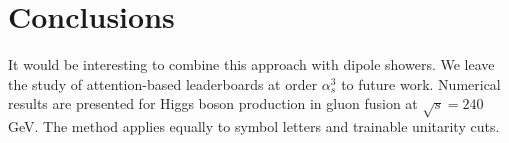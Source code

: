 \section{Conclusions}\label{sec:conclusions}

It would be interesting to combine this approach with dipole showers. We
leave the study of attention-based leaderboards at order $\alpha_s^3$ to
future work. Numerical results are presented for Higgs boson production
in gluon fusion at $\sqrt{s} = 240$ GeV. The method applies equally to
symbol letters and trainable unitarity cuts.


